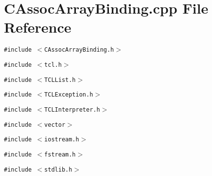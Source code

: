 \section{CAssoc\-Array\-Binding.cpp File Reference}
\label{CAssocArrayBinding_8cpp}
{\tt \#include $<$CAssoc\-Array\-Binding.h$>$}\par
{\tt \#include $<$tcl.h$>$}\par
{\tt \#include $<$TCLList.h$>$}\par
{\tt \#include $<$TCLException.h$>$}\par
{\tt \#include $<$TCLInterpreter.h$>$}\par
{\tt \#include $<$vector$>$}\par
{\tt \#include $<$iostream.h$>$}\par
{\tt \#include $<$fstream.h$>$}\par
{\tt \#include $<$stdlib.h$>$}\par
